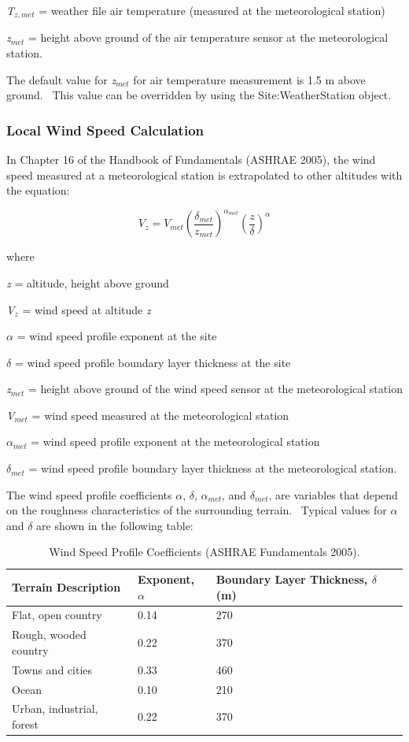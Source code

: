 \emph{T\(_{z,met}\)} = weather file air temperature (measured at the meteorological station)

\emph{z\(_{met}\)} = height above ground of the air temperature sensor at the meteorological station.

The default value for \emph{z\(_{met}\)} for air temperature measurement is 1.5 m above ground.~ This value can be overridden by using the Site:WeatherStation object.

\subsubsection{Local Wind Speed Calculation}\label{local-wind-speed-calculation}

In Chapter 16 of the Handbook of Fundamentals (ASHRAE 2005), the wind speed measured at a meteorological station is extrapolated to other altitudes with the equation:

\begin{equation}
{V_z} = {V_{met}}{\left( {\frac{{{\delta_{met}}}}{{{z_{met}}}}} \right)^{{\alpha_{met}}}}{\left( {\frac{z}{\delta }} \right)^\alpha }
\end{equation}

where

\emph{z} = altitude, height above ground

\emph{V\(_{z}\)} = wind speed at altitude \emph{z}

\emph{$\alpha$} = wind speed profile exponent at the site

\emph{$\delta$} = wind speed profile boundary layer thickness at the site

\emph{z\(_{met}\)} = height above ground of the wind speed sensor at the meteorological station

\emph{V\(_{met}\)} = wind speed measured at the meteorological station

\emph{$\alpha$\(_{met}\)} = wind speed profile exponent at the meteorological station

\emph{$\delta$\(_{met}\)} = wind speed profile boundary layer thickness at the meteorological station.

The wind speed profile coefficients \emph{$\alpha$}, \emph{$\delta$}, \emph{$\alpha$\(_{met}\)}, and \emph{$\delta$\(_{met}\)}, are variables that depend on the roughness characteristics of the surrounding terrain.~ Typical values for \emph{$\alpha$} and \emph{$\delta$} are shown in the following table:

\begin{longtable}[c]{p{3.0in}p{1.5in}p{1.5in}}

\caption{Wind Speed Profile Coefficients (ASHRAE Fundamentals 2005). \label{table:wind-speed-profile-coefficients-ashrae}} \tabularnewline
\toprule
Terrain Description       & Exponent, $\alpha$ & Boundary Layer Thickness, $\delta$ (m) \tabularnewline
\midrule
\endhead

Flat, open country        & 0.14 & 270 \tabularnewline
Rough, wooded country     & 0.22 & 370 \tabularnewline
Towns and cities          & 0.33 & 460 \tabularnewline
Ocean                     & 0.10 & 210 \tabularnewline
Urban, industrial, forest & 0.22 & 370 \tabularnewline
\bottomrule
\end{longtable}

